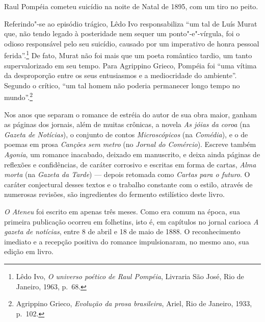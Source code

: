 Raul Pompéia cometeu suicídio na noite de Natal de 1895, com um tiro no peito.
\asterisc

Referindo"-se ao episódio trágico, Lêdo Ivo
responsabiliza ``um tal de Luís Murat que, não tendo legado à
posteridade nem sequer um ponto"-e"-vírgula, foi o odioso responsável
pelo seu suicídio, causado por um imperativo de honra pessoal
ferida''.\footnote{Lêdo Ivo, \textit{O universo poético de Raul
Pompéia}, Livraria São José, Rio de Janeiro, 1963, p.~68.} 
De fato, Murat não foi mais que um poeta
romântico tardio, um tanto supervalorizado em seu tempo. Para Agrippino
Grieco, Pompéia foi ``uma vítima da desproporção entre os seus
entusiasmos e a mediocridade do ambiente''. Segundo o crítico, ``um tal
homem não poderia permanecer longo tempo no mundo''.\footnote{Agrippino Grieco, 
\textit{Evolução da prosa brasileira}, Ariel, Rio de Janeiro, 1933, p.~102.}  

Nos anos que separam o romance de estréia do autor de
sua obra maior, ganham as páginas dos jornais, além de muitas crônicas,
a novela \textit{As jóias da coroa} (na
\textit{Gazeta de Notícias}), o conjunto de
contos \textit{Microscópicos} (na
\textit{Comédia}), e o de poemas em prosa
\textit{Canções sem metro} (no
\textit{Jornal do Comércio}). Escreve também
\textit{Agonia}, um romance inacabado,
deixado em manuscrito, e deixa ainda páginas de reflexões e
confidências, de caráter corrosivo e escritas em forma de cartas,
\textit{Alma morta} (na \textit{Gazeta da Tarde}) --- depois retomada
como \textit{Cartas para o futuro}. O
caráter conjectural desses textos e o trabalho constante com o estilo,
através de numerosas revisões, são ingredientes do fermento estilístico
deste livro.  

\textit{O Ateneu} foi escrito
em apenas três meses. Como era comum na época, sua primeira publicação
ocorreu em folhetins, isto é, em capítulos no jornal carioca
\textit{A gazeta de notícias}, entre 8 de
abril e 18 de maio de 1888. O reconhecimento imediato e a recepção
positiva do romance impulsionaram, no mesmo ano, sua edição em livro.

